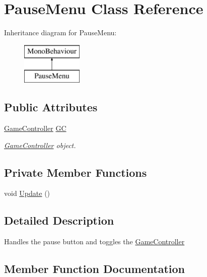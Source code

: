 \hypertarget{class_pause_menu}{}\section{Pause\+Menu Class Reference}
\label{class_pause_menu}
Inheritance diagram for Pause\+Menu\+:\begin{figure}[H]
\begin{center}
\leavevmode
\includegraphics[height=2.000000cm]{class_pause_menu}
\end{center}
\end{figure}
\subsection*{Public Attributes}
\begin{DoxyCompactItemize}
\item 
\mbox{\label{class_pause_menu_a52028e686cd9c745d5578a9ab6c22611}} 
\hyperlink{class_game_controller}{Game\+Controller} \hyperlink{class_pause_menu_a52028e686cd9c745d5578a9ab6c22611}{GC}
\begin{DoxyCompactList}\small\item\em \hyperlink{class_game_controller}{Game\+Controller} object. \end{DoxyCompactList}\end{DoxyCompactItemize}
\subsection*{Private Member Functions}
\begin{DoxyCompactItemize}
\item 
void \hyperlink{class_pause_menu_ad66a0552c131257182ce524f1c71ce4c}{Update} ()
\end{DoxyCompactItemize}


\subsection{Detailed Description}
Handles the pause button and toggles the \hyperlink{class_game_controller}{Game\+Controller} 

\subsection{Member Function Documentation}
\mbox{\label{class_pause_menu_ad66a0552c131257182ce524f1c71ce4c}} 
